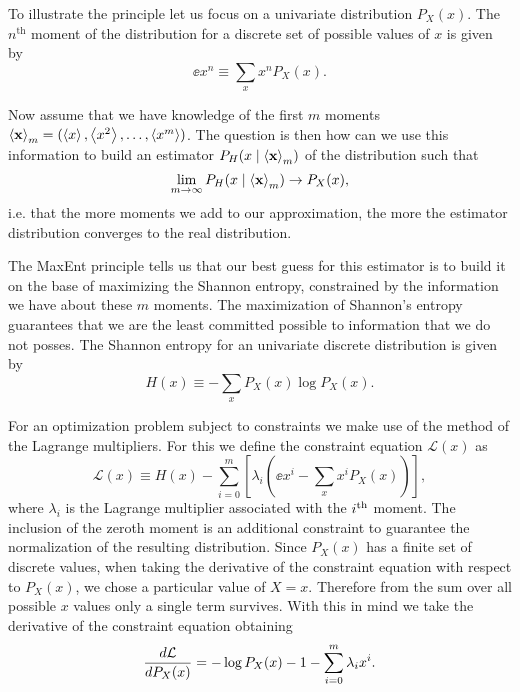 To illustrate the principle let us focus on a univariate distribution $P_X(x)$.
The $n^{\text{th}}$ moment of the distribution for a discrete set of possible
values of $x$ is given by
\begin{equation}
  \ee{x^n} \equiv \sum_x x^n P_X(x).
  \label{eq_mom_ref}
\end{equation}

Now assume that we have knowledge of the first $m$ moments $\mathbf{\left\langle x \right\rangle}_m = (
\left\langle x \right\rangle, \left\langle x^2 \right\rangle, \ldots, \left\langle x^m \right\rangle )$. The question is then how can we use this
information to build an estimator $P_H(x \mid \mathbf{\left\langle x \right\rangle}_m)$ of the
distribution
such that
\begin{equation}
  \lim_{m \rightarrow \infty} P_H(x \mid \mathbf{\left\langle x \right\rangle}_m) \rightarrow P_X(x),
\end{equation}
i.e. that the more moments we add to our approximation, the more the estimator
distribution converges to the real distribution.

The MaxEnt principle tells us that our best guess for this estimator is to build
it on the base of maximizing the Shannon entropy, constrained by the information
we have about these $m$ moments. The maximization of Shannon's entropy
guarantees that we are the least committed possible to information that we do
not posses. The Shannon entropy for an univariate discrete distribution is
given by \cite{Shannon1948}
\begin{equation}
  H(x) \equiv - \sum_x P_X(x) \log P_X(x).
\end{equation}

For an optimization problem subject to constraints we make use of the method of
the Lagrange multipliers. For this we define the constraint equation
$\mathcal{L}(x)$ as
\begin{equation}
  \mathcal{L}(x) \equiv H(x) - \sum_{i=0}^m
  \left[ \lambda_i \left( \ee{x^i} - \sum_x x^i P_X(x) \right) \right],
  \label{seq_constraint_eq}
\end{equation}
where $\lambda_i$ is the Lagrange multiplier associated with the $i^\text{th}$ moment.
The inclusion of the zeroth moment is an additional constraint to guarantee the
normalization of the resulting distribution. Since $P_X(x)$ has a finite set of
discrete values, when taking the derivative of the constraint equation with
respect to $P_X(x)$, we chose a particular value of $X = x$. Therefore from the
sum over all possible $x$ values only a single term survives. With this in mind
we take the derivative of the constraint equation obtaining
\begin{equation}
  {d\mathcal{L} \over d P_X(x)} = -\log P_X(x) - 1 -
  \sum_{i=0}^m \lambda_i x^i.
\end{equation}

